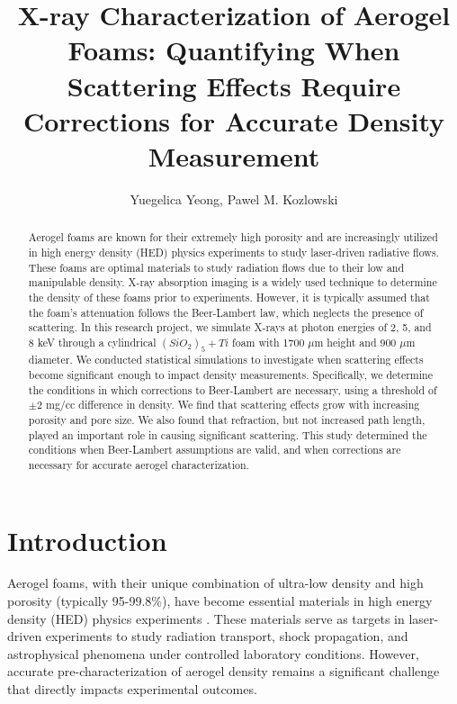 \documentclass[twocolumn]{aastex701}
\begin{document}
\title{X-ray Characterization of Aerogel Foams: Quantifying When Scattering Effects Require Corrections for Accurate Density Measurement}

\author{Yuegelica Yeong, Pawel M. Kozlowski}

\begin{abstract}
Aerogel foams are known for their extremely high porosity and are increasingly utilized in high energy density (HED) physics experiments to study laser-driven radiative flows. These foams are optimal materials to study radiation flows due to their low and manipulable density. X-ray absorption imaging is a widely used technique to determine the density of these foams prior to experiments. However, it is typically assumed that the foam's attenuation follows the Beer-Lambert law, which neglects the presence of scattering. In this research project, we simulate X-rays at photon energies of 2, 5, and 8 keV through a cylindrical $(SiO_{2})_{5}+Ti$ foam with 1700 $\mu$m height and 900 $\mu$m diameter. We conducted statistical simulations to investigate when scattering effects become significant enough to impact density measurements. Specifically, we determine the conditions in which corrections to Beer-Lambert are necessary, using a threshold of $\pm 2$ mg/cc difference in density. We find that scattering effects grow with increasing porosity and pore size. We also found that refraction, but not increased path length, played an important role in causing significant scattering. This study determined the conditions when Beer-Lambert assumptions are valid, and when corrections are necessary for accurate aerogel characterization.
\end{abstract}


\section{Introduction}

Aerogel foams, with their unique combination of ultra-low density and high porosity (typically 95-99.8\%), have become essential materials in high energy density (HED) physics experiments \citep{Lanier_Hamilton_Taccetti_2012}. These materials serve as targets in laser-driven experiments to study radiation transport, shock propagation, and astrophysical phenomena under controlled laboratory conditions. However, accurate pre-characterization of aerogel density remains a significant challenge that directly impacts experimental outcomes.
\end{document}
